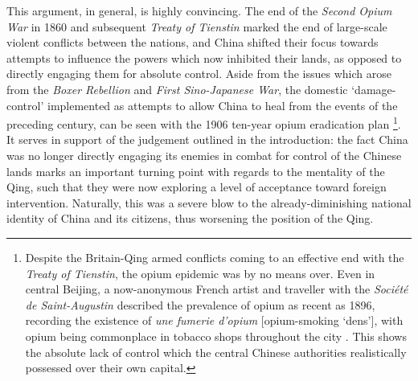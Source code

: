 \documentclass[a4paper,oneside]{article}
\begin{document}
This argument, in general, is highly convincing. The end of the \textit{Second
Opium War} in 1860 and subsequent \textit{Treaty of Tienstin} marked the end of
large-scale violent conflicts between the nations, and China shifted their focus
towards attempts to influence the powers which now inhibited their lands, as
opposed to directly engaging them for absolute control. Aside from the issues
which arose from the \textit{Boxer Rebellion} and \textit{First Sino-Japanese
War}, the domestic `damage-control' implemented as attempts to allow China to
heal from the events of the preceding century, can be seen with the 1906
ten-year opium eradication plan
\autocites{Trocki:1999}{Owen:1934}\footnote{Despite the Britain-Qing armed
conflicts coming to an effective end with the \textit{Treaty of Tienstin}, the
opium epidemic was by no means over. Even in central Beijing, a now-anonymous
French artist and traveller with the \textit{Soci\'et\'e de Saint-Augustin}
described the prevalence of opium as recent as 1896, recording the existence of
\textit{une fumerie d'opium} [opium-smoking `dens'], with opium being
commonplace in tobacco shops throughout the city \autocite{FrenchArtist:1896}.
This shows the absolute lack of control which the central Chinese authorities
realistically possessed over their own capital.}. It serves in support of the
judgement outlined in the introduction: the fact China was no longer directly
engaging its enemies in combat for control of the Chinese lands marks an
important turning point with regards to the mentality of the Qing, such that
they were now exploring a level of acceptance toward foreign intervention.
Naturally, this was a severe blow to the already-diminishing national identity
of China and its citizens, thus worsening the position of the Qing.

\end{document}
